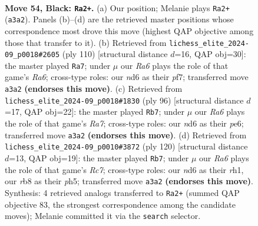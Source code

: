 \documentclass[11pt]{article}
\begin{document}
\clearpage

\begin{figure}[p]\centering
\begin{subfigure}{0.46\textwidth}\centering
\resizebox{\linewidth}{!}{%
\newchessgame
\chessboard[
  setfen={1R6/6p1/3N1pk1/7p/3P3P/r5P1/5K2/8 b - - 2 54},
  showmover=false,
  pgfstyle=straightmove, color=movearrow, markmove={a3-a2}
]}
\caption{}
\end{subfigure}\hfill
\begin{subfigure}{0.46\textwidth}\centering
\resizebox{\linewidth}{!}{%
\newchessgame
\chessboard[
  setfen={8/5pk1/R5p1/7p/4P2P/5PK1/6P1/2r5 w - - 33 56},
  showmover=false,
  pgfstyle=straightmove, color=movearrow, markmove={a6-a7}
]}
\caption{}
\end{subfigure}
\\[4pt]
\begin{subfigure}{0.46\textwidth}\centering
\resizebox{\linewidth}{!}{%
\newchessgame
\chessboard[
  setfen={5k2/R5p1/4pp1p/2r5/5P2/4K1P1/5P2/8 w - - 2 49},
  showmover=false,
  pgfstyle=straightmove, color=movearrow, markmove={a7-b7}
]}
\caption{}
\end{subfigure}\hfill
\begin{subfigure}{0.46\textwidth}\centering
\resizebox{\linewidth}{!}{%
\newchessgame
\chessboard[
  setfen={5k2/2R2p2/6p1/7p/4P2P/5PK1/6P1/7r w - - 7 61},
  showmover=false,
  pgfstyle=straightmove, color=movearrow, markmove={c7-b7}
]}
\caption{}
\end{subfigure}
\caption{\textbf{Move 54, Black: \texttt{Ra2+}.} (a) Our position; Melanie plays \texttt{Ra2+} (\texttt{a3a2}). Panels (b)--(d) are the retrieved master positions whose correspondence most drove this move (highest QAP objective among those that transfer to it). (b) Retrieved from \texttt{lichess\_elite\_2024-09\_p0018\#2605} (ply 110) [structural distance $d$=16, QAP obj=30]: the master played \texttt{Ra7}; under $\mu$ our \emph{Ra6} plays the role of that game's \emph{Ra6}; cross-type roles: our \emph{n}d6 as their \emph{p}f7; transferred move \texttt{a3a2} \textbf{(endorses this move)}. (c) Retrieved from \texttt{lichess\_elite\_2024-09\_p0018\#1830} (ply 96) [structural distance $d$=17, QAP obj=22]: the master played \texttt{Rb7}; under $\mu$ our \emph{Ra6} plays the role of that game's \emph{Ra7}; cross-type roles: our \emph{n}d6 as their \emph{p}e6; transferred move \texttt{a3a2} \textbf{(endorses this move)}. (d) Retrieved from \texttt{lichess\_elite\_2024-09\_p0010\#3872} (ply 120) [structural distance $d$=13, QAP obj=19]: the master played \texttt{Rb7}; under $\mu$ our \emph{Ra6} plays the role of that game's \emph{Rc7}; cross-type roles: our \emph{n}d6 as their \emph{r}h1, our \emph{r}b8 as their \emph{p}h5; transferred move \texttt{a3a2} \textbf{(endorses this move)}. Synthesis: 4 retrieved analogs transferred to \texttt{Ra2+} (summed QAP objective 83, the strongest correspondence among the candidate moves); Melanie committed it via the \texttt{search} selector.}
\label{fig:thought-m107}
\end{figure}
\end{document}
